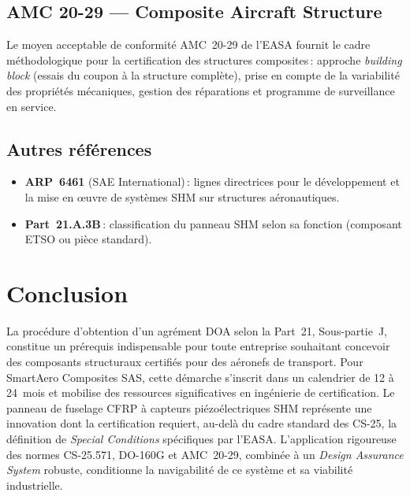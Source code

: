 \documentclass[12pt,a4paper]{article}
\begin{document}
\subsection{AMC 20-29 --- Composite Aircraft Structure}

Le moyen acceptable de conformité AMC~20-29 de l'EASA fournit le cadre méthodologique pour la certification des structures composites\,: approche \textit{building block} (essais du coupon à la structure complète), prise en compte de la variabilité des propriétés mécaniques, gestion des réparations et programme de surveillance en service.

\subsection{Autres références}

\begin{itemize}[nosep]
    \item \textbf{ARP~6461} (SAE International)\,: lignes directrices pour le développement et la mise en \oe uvre de systèmes SHM sur structures aéronautiques.
    \item \textbf{Part~21.A.3B}\,: classification du panneau SHM selon sa fonction (composant ETSO ou pièce standard).
\end{itemize}

\section{Conclusion}

La procédure d'obtention d'un agrément DOA selon la Part~21, Sous-partie~J, constitue un prérequis indispensable pour toute entreprise souhaitant concevoir des composants structuraux certifiés pour des aéronefs de transport. Pour SmartAero Composites SAS, cette démarche s'inscrit dans un calendrier de 12 à 24~mois et mobilise des ressources significatives en ingénierie de certification. Le panneau de fuselage CFRP à capteurs piézoélectriques SHM représente une innovation dont la certification requiert, au-delà du cadre standard des CS-25, la définition de \textit{Special Conditions} spécifiques par l'EASA. L'application rigoureuse des normes CS-25.571, DO-160G et AMC~20-29, combinée à un \textit{Design Assurance System} robuste, conditionne la navigabilité de ce système et sa viabilité industrielle.

\appendix
\end{document}
